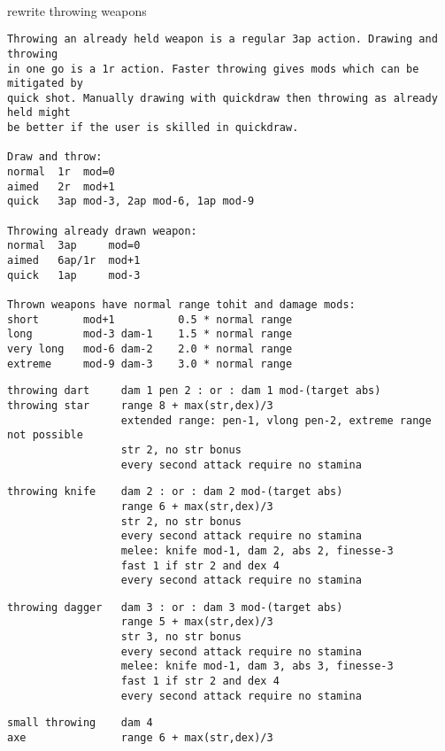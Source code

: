 \

\todo rewrite throwing weapons
\goodbreak \small \begin{samepage} \begin{verbatim}
Throwing an already held weapon is a regular 3ap action. Drawing and throwing
in one go is a 1r action. Faster throwing gives mods which can be mitigated by
quick shot. Manually drawing with quickdraw then throwing as already held might
be better if the user is skilled in quickdraw.

Draw and throw:
normal  1r  mod=0
aimed   2r  mod+1
quick   3ap mod-3, 2ap mod-6, 1ap mod-9

Throwing already drawn weapon:
normal  3ap     mod=0
aimed   6ap/1r  mod+1
quick   1ap     mod-3

Thrown weapons have normal range tohit and damage mods:
short       mod+1          0.5 * normal range
long        mod-3 dam-1    1.5 * normal range
very long   mod-6 dam-2    2.0 * normal range
extreme     mod-9 dam-3    3.0 * normal range
\end{verbatim} \blocklistgap \begin{verbatim}
throwing dart     dam 1 pen 2 : or : dam 1 mod-(target abs)
throwing star     range 8 + max(str,dex)/3
                  extended range: pen-1, vlong pen-2, extreme range not possible
                  str 2, no str bonus
                  every second attack require no stamina
\end{verbatim} \blocklistgap \begin{verbatim}
throwing knife    dam 2 : or : dam 2 mod-(target abs)
                  range 6 + max(str,dex)/3
                  str 2, no str bonus
                  every second attack require no stamina
                  melee: knife mod-1, dam 2, abs 2, finesse-3
                  fast 1 if str 2 and dex 4
                  every second attack require no stamina
\end{verbatim} \blocklistgap \begin{verbatim}
throwing dagger   dam 3 : or : dam 3 mod-(target abs)
                  range 5 + max(str,dex)/3
                  str 3, no str bonus
                  every second attack require no stamina
                  melee: knife mod-1, dam 3, abs 3, finesse-3
                  fast 1 if str 2 and dex 4
                  every second attack require no stamina
\end{verbatim} \blocklistgap \begin{verbatim}
small throwing    dam 4
axe               range 6 + max(str,dex)/3

\end{verbatim}
\end{samepage}
